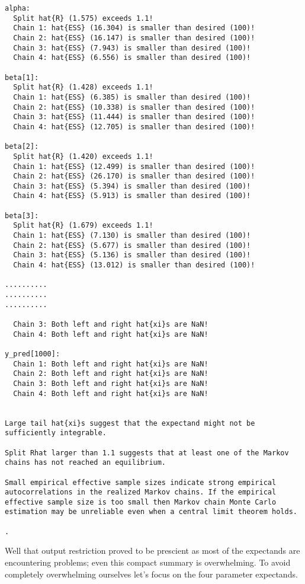 \documentclass[
  letterpaper,
  DIV=11,
  numbers=noendperiod]{scrartcl}
\begin{document}
\begin{verbatim}
alpha:
  Split hat{R} (1.575) exceeds 1.1!
  Chain 1: hat{ESS} (16.304) is smaller than desired (100)!
  Chain 2: hat{ESS} (16.147) is smaller than desired (100)!
  Chain 3: hat{ESS} (7.943) is smaller than desired (100)!
  Chain 4: hat{ESS} (6.556) is smaller than desired (100)!

beta[1]:
  Split hat{R} (1.428) exceeds 1.1!
  Chain 1: hat{ESS} (6.385) is smaller than desired (100)!
  Chain 2: hat{ESS} (10.338) is smaller than desired (100)!
  Chain 3: hat{ESS} (11.444) is smaller than desired (100)!
  Chain 4: hat{ESS} (12.705) is smaller than desired (100)!

beta[2]:
  Split hat{R} (1.420) exceeds 1.1!
  Chain 1: hat{ESS} (12.499) is smaller than desired (100)!
  Chain 2: hat{ESS} (26.170) is smaller than desired (100)!
  Chain 3: hat{ESS} (5.394) is smaller than desired (100)!
  Chain 4: hat{ESS} (5.913) is smaller than desired (100)!

beta[3]:
  Split hat{R} (1.679) exceeds 1.1!
  Chain 1: hat{ESS} (7.130) is smaller than desired (100)!
  Chain 2: hat{ESS} (5.677) is smaller than desired (100)!
  Chain 3: hat{ESS} (5.136) is smaller than desired (100)!
  Chain 4: hat{ESS} (13.012) is smaller than desired (100)!

..........
..........
..........

  Chain 3: Both left and right hat{xi}s are NaN!
  Chain 4: Both left and right hat{xi}s are NaN!

y_pred[1000]:
  Chain 1: Both left and right hat{xi}s are NaN!
  Chain 2: Both left and right hat{xi}s are NaN!
  Chain 3: Both left and right hat{xi}s are NaN!
  Chain 4: Both left and right hat{xi}s are NaN!


Large tail hat{xi}s suggest that the expectand might not be
sufficiently integrable.

Split Rhat larger than 1.1 suggests that at least one of the Markov
chains has not reached an equilibrium.

Small empirical effective sample sizes indicate strong empirical
autocorrelations in the realized Markov chains. If the empirical
effective sample size is too small then Markov chain Monte Carlo
estimation may be unreliable even when a central limit theorem holds.

.
\end{verbatim}

Well that output restriction proved to be prescient as most of the
expectands are encountering problems; even this compact summary is
overwhelming. To avoid completely overwhelming ourselves let's focus on
the four parameter expectands.
\end{document}
